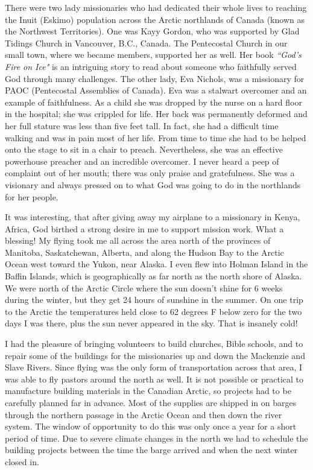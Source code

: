 \documentclass[oneside,12pt]{book}
\begin{document}
There were two lady missionaries who had dedicated their whole lives to reaching the Inuit (Eskimo) population across the Arctic northlands of Canada (known as the Northwest Territories). One was Kayy Gordon, who was supported by Glad Tidings Church in Vancouver, B.C., Canada. The Pentecostal Church in our small town, where we became members, supported her as well. Her book \textit{``God's Fire on Ice"} is an intriguing story to read about someone who faithfully served God through many challenges. The other lady, Eva Nichols, was a missionary for PAOC (Pentecostal Assemblies of Canada). Eva was a stalwart overcomer and an example of faithfulness. As a child she was dropped by the nurse on a hard floor in the hospital; she was crippled for life. Her back was permanently deformed and her full stature was less than five feet tall. In fact, she had a difficult time walking and was in pain most of her life. From time to time she had to be helped onto the stage to sit in a chair to preach. Nevertheless, she was an effective powerhouse preacher and an incredible overcomer. I never heard a peep of complaint out of her mouth; there was only praise and gratefulness. She was a visionary and always pressed on to what God was going to do in the northlands for her people.

It was interesting, that after giving away my airplane to a missionary in Kenya, Africa, God birthed a strong desire in me to support mission work. What a blessing! My flying took me all across the area north of the provinces of Manitoba, Saskatchewan, Alberta, and along the Hudson Bay to the Arctic Ocean west toward the Yukon, near Alaska. I even flew into Holman Island in the Baffin Islands, which is geographically as far north as the north shore of Alaska. We were north of the Arctic Circle where the sun doesn't shine for 6 weeks during the winter, but they get 24 hours of sunshine in the summer. On one trip to the Arctic the temperatures held close to 62 degrees F below zero for the two days I was there, plus the sun never appeared in the sky. That is insanely cold!

I had the pleasure of bringing volunteers to build churches, Bible schools, and to repair some of the buildings for the missionaries up and down the Mackenzie and Slave Rivers. Since flying was the only form of transportation across that area, I was able to fly pastors around the north as well. It is not possible or practical to manufacture building materials in the Canadian Arctic, so projects had to be carefully planned far in advance. Most of the supplies are shipped in on barges through the northern passage in the Arctic Ocean and then down the river system. The window of opportunity to do this was only once a year for a short period of time. Due to severe climate changes in the north we had to schedule the building projects between the time the barge arrived and when the next winter closed in.
\end{document}
